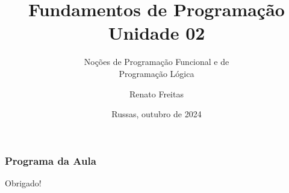 \documentclass[11pt]{beamer}
\begin{document}
	\title{Fundamentos de Programação \\ Unidade 02}
	\subtitle{Noções de Programação Funcional e de \\Programação Lógica}
	\author{Renato Freitas}
	\date{Russas, outubro de 2024}
	\begin{frame}[plain]
		\maketitle
	\end{frame}
	
	
	\begin{frame}
		\frametitle{Programa da Aula}
		\tableofcontents
	\end{frame}


	



	\begin{frame}[plain]
		\maketitle
		\centering
		Obrigado!
	\end{frame}
\end{document}
